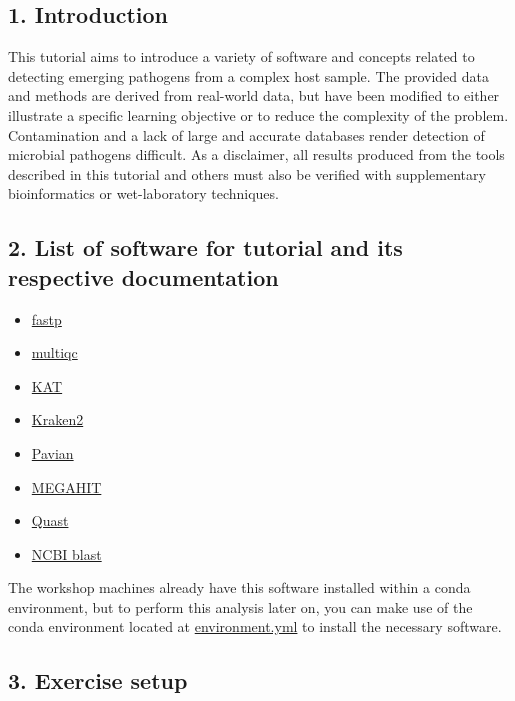 \documentclass[
]{book}
\providecommand{\tightlist}{%
  \setlength{\itemsep}{0pt}\setlength{\parskip}{0pt}}
\begin{document}
\subsection{1. Introduction}\label{intro}

This tutorial aims to introduce a variety of software and concepts related to detecting emerging pathogens from a complex host sample. The provided data and methods are derived from real-world data, but have been modified to either illustrate a specific learning objective or to reduce the complexity of the problem. Contamination and a lack of large and accurate databases render detection of microbial pathogens difficult. As a disclaimer, all results produced from the tools described in this tutorial and others must also be verified with supplementary bioinformatics or wet-laboratory techniques.

\subsection{2. List of software for tutorial and its respective documentation}\label{software}

\begin{itemize}
\tightlist
\item
  \href{https://github.com/OpenGene/fastp}{fastp}
\item
  \href{https://multiqc.info/}{multiqc}
\item
  \href{https://kat.readthedocs.io/en/latest/}{KAT}
\item
  \href{https://ccb.jhu.edu/software/kraken2/}{Kraken2}
\item
  \href{https://fbreitwieser.shinyapps.io/pavian/}{Pavian}
\item
  \href{https://github.com/voutcn/megahit}{MEGAHIT}
\item
  \href{http://quast.sourceforge.net/quast}{Quast}
\item
  \href{https://blast.ncbi.nlm.nih.gov/Blast.cgi}{NCBI blast}
\end{itemize}

The workshop machines already have this software installed within a conda environment, but to perform this analysis later on, you can make use of the conda environment located at \url{environment.yml} to install the necessary software.

\subsection{3. Exercise setup}\label{setup}
\end{document}
